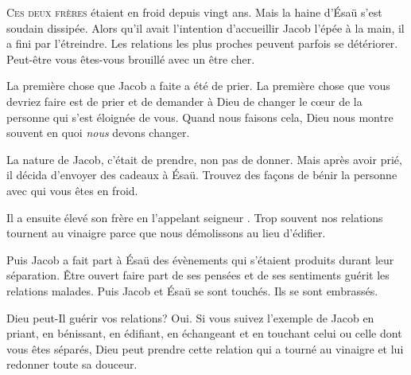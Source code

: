 



\lettrine{C}{es deux frères} étaient en froid depuis vingt ans.
 Mais la haine d'Ésaü s'est soudain dissipée.
 Alors qu'il avait l'intention d'accueillir Jacob l'épée à la main,
 il a fini par l'étreindre. Les relations les plus proches peuvent parfois se détériorer.
 Peut-être vous êtes-vous brouillé avec un être cher.


La première chose que Jacob a faite a été de prier.
 La première chose que vous devriez faire est de prier et de demander
 à Dieu de changer le c\oe{}ur de la personne qui s'est éloignée de vous.
 Quand nous faisons cela, Dieu nous montre souvent en quoi \emph{nous} devons changer.

La nature de Jacob, c'était de prendre, non pas de donner.
 Mais après avoir prié, il décida d'envoyer des cadeaux à Ésaü.
 Trouvez des fa\c{c}ons de bénir la personne avec qui vous êtes en froid. 

Il a ensuite élevé son frère en l'appelant \Og seigneur \Fg{}.
 Trop souvent nos relations tournent au vinaigre parce que nous démolissons
 au lieu d'édifier. 

Puis Jacob a fait part à Ésaü des évènements
 qui s'étaient produits durant leur séparation.
 Être ouvert \ocadr{}faire part de ses pensées et de ses sentiments\fcadr{}
 guérit les relations malades.
 Puis Jacob et Ésaü se sont touchés. Ils se sont embrassés. 

Dieu peut-Il guérir vos relations? Oui. Si vous suivez l'exemple de Jacob
 \ocadr{}en priant, en bénissant, en édifiant, en échangeant et en touchant
 celui ou celle dont vous êtes séparés, Dieu peut prendre cette relation
 qui a tourné au vinaigre et lui redonner toute sa douceur. 

\dvrule



